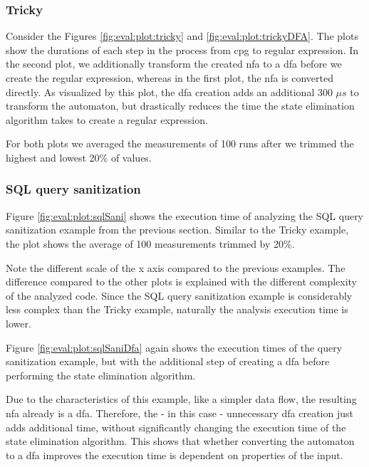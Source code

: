 \subsubsection{Tricky}

Consider the Figures \ref{fig:eval:plot:tricky} and \ref{fig:eval:plot:trickyDFA}. 
The plots show the durations of each step in the process from \ac{cpg} to regular expression. 
In the second plot, we additionally transform the created \ac{nfa} to a \ac{dfa} before we create the regular expression, whereas in the first plot, the \ac{nfa} is converted directly. As visualized by this plot, the \ac{dfa} creation adds an additional 300 $\mu s$ to transform the automaton, but drastically reduces the time the state elimination algorithm takes to create a regular expression.

For both plots we averaged the measurements of 100 runs after we trimmed the highest and lowest 20\% of values.

\subsubsection{SQL query sanitization}

Figure \ref{fig:eval:plot:sqlSani} shows the execution time of analyzing the SQL query sanitization example from the previous section. Similar to the Tricky example, the plot shows the average of 100 measurements trimmed by 20\%. 

Note the different scale of the x axis compared to the previous examples. The difference compared to the other plots is explained with the different complexity of the analyzed code. Since the SQL query sanitization example is considerably less complex than the Tricky example, naturally the analysis execution time is lower. 

Figure \ref{fig:eval:plot:sqlSaniDfa} again shows the execution times of the query sanitization example, but with the additional step of creating a \ac{dfa} before performing the state elimination algorithm.

Due to the characteristics of this example, like a simpler data flow, the resulting \ac{nfa} already is a \ac{dfa}. Therefore, the - in this case - unnecessary \ac{dfa} creation just adds additional time, without significantly changing the execution time of the state elimination algorithm. This shows that whether converting the automaton to a \ac{dfa} improves the execution time is dependent on properties of the input.

